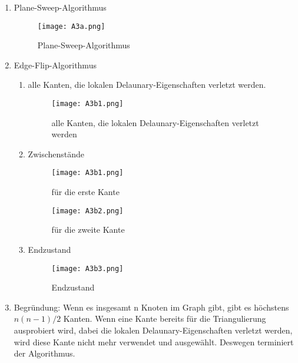 \documentclass[12pt]{scrartcl}
\begin{document}
\setcounter{exnum}{3} %
\begin{enumerate}

  \item Plane-Sweep-Algorithmus
  \begin{figure}[!h]
    \centering
      \texttt{[image: A3a.png]}
    \caption{Plane-Sweep-Algorithmus}
  \end{figure}

  \item Edge-Flip-Algorithmus

  \begin{enumerate}
    \item alle Kanten, die lokalen Delaunary-Eigenschaften verletzt werden.
    \begin{figure}[!h]
      \centering
        \texttt{[image: A3b1.png]}
      \caption{alle Kanten, die lokalen Delaunary-Eigenschaften verletzt werden}
    \end{figure}

    \newpage
    
    \item Zwischenstände
    \begin{figure}[!h]
      \centering
        \texttt{[image: A3b1.png]}
      \caption{für die erste Kante}
    \end{figure}
    \begin{figure}[!h]
      \centering
        \texttt{[image: A3b2.png]}
      \caption{für die zweite Kante}
    \end{figure}

    \newpage

    \item Endzustand
    \begin{figure}[!h]
      \centering
        \texttt{[image: A3b3.png]}
      \caption{Endzustand}
    \end{figure}
  \end{enumerate}

  \item Begründung: Wenn es insgesamt n Knoten im Graph gibt, gibt es höchstens $n(n-1)/2$ Kanten. Wenn eine Kante bereits für die Triangulierung ausprobiert wird, dabei die 
  lokalen Delaunary-Eigenschaften verletzt werden, wird diese Kante nicht mehr verwendet und ausgewählt. Deswegen terminiert der Algorithmus.
  
\end{enumerate}
\end{document}
